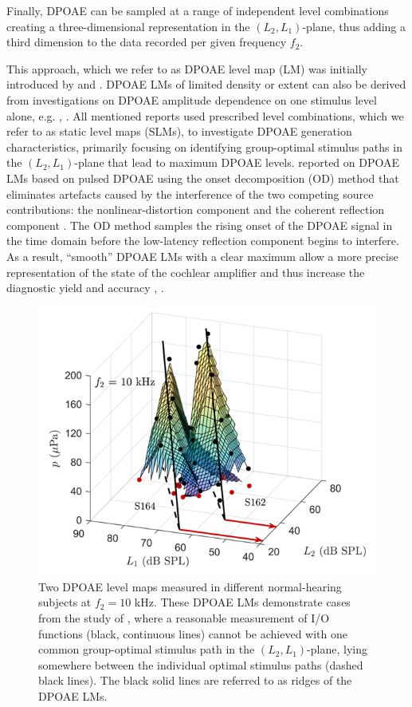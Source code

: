 \documentclass[journal,twoside,web]{ieeecolor2}
\begin{document}
Finally, DPOAE can be sampled at a range of independent level combinations creating a three-dimensional representation in the $(L_2, L_1)$-plane, thus adding a third dimension to the data recorded per given frequency $f_2$.
 
This approach, which we refer to as DPOAE level map (LM) was initially introduced by \cite{Wh1995} and \cite{Km2000}.
DPOAE LMs of limited density or extent can also be derived from investigations on DPOAE amplitude dependence on one stimulus level alone, e.g. \cite{GK1990}, \cite{Nl2005}.
All mentioned reports used prescribed level combinations, which we refer to as static level maps (SLMs), to investigate DPOAE generation characteristics, primarily focusing on identifying group-optimal stimulus paths in the $(L_2, L_1)$-plane that lead to maximum DPOAE levels.
\cite{ZD2015a} reported on DPOAE LMs based on pulsed DPOAE using the onset decomposition (OD) method that eliminates artefacts caused by the interference of the two competing source contributions: the nonlinear-distortion component and the coherent reflection component \cite{ZD2015}.
The OD method samples the rising onset of the DPOAE signal in the time domain before the low-latency reflection component begins to interfere.
As a result, “smooth” DPOAE LMs with a clear maximum allow a more precise representation of the state of the cochlear amplifier and thus increase the diagnostic yield and accuracy \cite{ZD2015a}, \cite{ZD2020}.

\begin{figure}[ht]
\centerline{\includegraphics[width=\columnwidth]{Fig_0_v1.png}}
\caption{Two DPOAE level maps measured in different normal-hearing subjects at $f_2 = 10$ kHz.
These DPOAE LMs demonstrate cases from the study of \cite{Br2021}, where a reasonable measurement of I/O functions (black, continuous lines) cannot be achieved with one common group-optimal stimulus path in the $(L_2, L_1)$-plane, lying somewhere between the individual optimal stimulus paths (dashed black lines).
The black solid lines are referred to as ridges of the DPOAE LMs.}
\label{fig_Bdr}
\end{figure}
\end{document}
